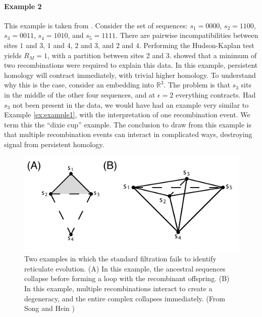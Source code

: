 \paragraph{Example 2}
\label{ex:example2}
%
This example is taken from \citet{Song:2005}.
Consider the set of sequences: $s_{1}=0000$, $s_{2}=1100$, $s_{3}=0011$, $s_{4}=1010$, and $s_{5}=1111$.
There are pairwise incompatibilities between sites $1$ and $3$, $1$ and $4$, $2$ and $3$, and $2$ and $4$.
Performing the Hudson-Kaplan test yields $R_M=1$, with a partition between sites 2 and 3.
\citet{Song:2005} showed that a minimum of two recombinations were required to explain this data.
In this example, persistent homology will contract immediately, with trivial higher homology.
To understand why this is the case, consider an embedding into $\mathbb{R}^3$.
The problem is that $s_{3}$ sits in the middle of the other four sequences, and at $\epsilon=2$ everything contracts.
Had $s_{3}$ not been present in the data, we would have had an example very similar to Example \ref{ex:example1}, with the interpretation of one recombination event.
We term this the ``dixie cup'' example.
The conclusion to draw from this example is that multiple recombination events can interact in complicated ways, destroying signal from persistent homology.

\begin{figure}
\centering
\includegraphics[width=\columnwidth]{./fig/complex_construction/simple_examples_1.pdf}
\caption[Two examples of reduced sensitivity of the Vietoris-Rips Complex]{Two examples in which the standard filtration fails to identify reticulate evolution. (A) In this example, the ancestral sequences collapse before forming a loop with the recombinant offspring. (B) In this example, multiple recombinations interact to create a degeneracy, and the entire complex collapses immediately. (From Song and Hein \cite{Song:2005})}
\label{fig:complex_construction:simple_examples}
\end{figure}

